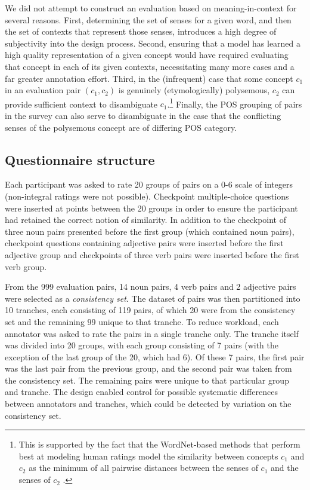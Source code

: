 We did not attempt to construct an evaluation based on meaning-in-context for several reasons. First, determining the set of senses for a given word, and then the set of contexts that represent those senses, introduces a high degree of subjectivity into the design process. Second, ensuring that a model has learned a high quality representation of a given concept would have required evaluating that concept in each of its given contexts, necessitating many more cases and a far greater annotation effort. Third, in the (infrequent) case that some concept \(c_1\) in an evaluation pair \((c_1,c_2)\) is genuinely (etymologically) polysemous, \( c_2 \) can provide sufficient context to disambiguate \(c_1\).\footnote{This is supported by the fact that the WordNet-based methods that perform best at modeling human ratings  model the similarity between concepts \( c_1 \) and \( c_2 \) as the minimum of all pairwise distances between the senses of \(c_1\) and the senses of \(c_2\) \cite{resnik1995using,pedersen2004wordnet}.} Finally, the POS grouping of pairs in the survey can also serve to disambiguate in the case that the conflicting senses of the polysemous concept are of differing POS category.

\subsection{Questionnaire structure}

Each participant was asked to rate 20 groups of pairs on a 0-6 scale of integers (non-integral ratings were not possible). Checkpoint multiple-choice questions were inserted at points between the 20 groups in order to ensure the participant had retained the correct notion of similarity. In addition to the checkpoint of three noun pairs presented before the first group (which contained noun pairs), checkpoint questions containing adjective pairs were inserted before the first adjective group and checkpoints of three verb pairs were inserted before the first verb group.     

From the 999 evaluation pairs, 14 noun pairs, 4 verb pairs and 2 adjective pairs were selected as a \emph{consistency set}. The dataset of pairs was then partitioned into 10 tranches, each consisting of 119 pairs, of which 20 were from the consistency set and the remaining 99 unique to that tranche. To reduce workload, each annotator was asked to rate the pairs in a single tranche only. The tranche itself was divided into 20 groups, with each group consisting of 7 pairs (with the exception of the last group of the 20, which had 6). Of these 7 pairs, the first pair was the last pair from the previous group, and the second pair was taken from the consistency set. The remaining pairs were unique to that particular group and tranche. The design enabled control for possible systematic differences between annotators and tranches, which could be detected by variation on the consistency set. 

